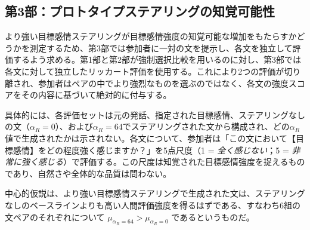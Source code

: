 \subsection{第3部：プロトタイプステアリングの知覚可能性}

より強い目標感情ステアリングが目標感情強度の知覚可能な増加をもたらすかどうかを測定するため、第3部では参加者に一対の文を提示し、各文を独立して評価するよう求める。第1部と第2部が強制選択比較を用いるのに対し、第3部では各文に対して独立したリッカート評価を使用する。これにより2つの評価が切り離され、参加者はペアの中でより強烈なものを選ぶのではなく、各文の強度スコアをその内容に基づいて絶対的に付与する。\par

具体的には、各評価セットは元の発話、指定された目標感情、ステアリングなしの文（$\alpha_R = 0$）、および$\alpha_R = 64$でステアリングされた文から構成され、どの$\alpha_R$値で生成されたかは示されない。各文について、参加者は「この文において【目標感情】をどの程度強く感じますか？」を5点尺度（1 = \textit{全く感じない}；5 = \textit{非常に強く感じる}）で評価する。この尺度は知覚された目標感情強度を捉えるものであり、自然さや全体的な品質は問わない。\par

中心的仮説は、より強い目標感情ステアリングで生成された文は、ステアリングなしのベースラインよりも高い人間評価強度を得るはずである、すなわち6組の文ペアのそれぞれについて $\mu_{\alpha_R=64} > \mu_{\alpha_R=0}$ であるというものだ。\par

